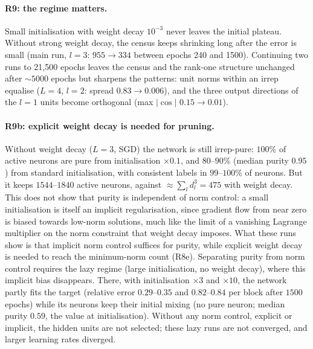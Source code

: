 \documentclass[a4paper,11pt]{article}
\theoremstyle{remark}
\theoremstyle{definition}
\begin{document}
\paragraph{R9: the regime matters.} Small initialisation with weight decay
$10^{-3}$ never leaves the initial plateau. Without strong weight decay, the census
keeps shrinking long after the error is small (main run, $l=3$: $955\to334$
between epochs 240 and 1500). Continuing two runs to 21{,}500 epochs leaves the
census and the rank-one structure unchanged after $\sim5000$ epochs but sharpens
the patterns: unit norms within an irrep equalise ($L=4$, $l=2$: spread
$0.83\to0.006$), and the three output directions of the $l=1$ units become
orthogonal (max $|\cos|$ $0.15\to0.01$).

\paragraph{R9b: explicit weight decay is needed for pruning.} Without weight decay
($L=3$, SGD) the network is still irrep-pure: $100\%$ of active neurons are pure
from initialisation $\times0.1$, and $80$--$90\%$ (median purity $0.95$) from
standard initialisation, with consistent labels in $99$--$100\%$ of neurons. But it
keeps $1544$--$1840$ active neurons, against $\approx\sum_ld_l^3=475$ with weight
decay. This does not show that purity is independent of norm control: a small
initialisation is itself an implicit regularisation, since gradient flow from near
zero is biased towards low-norm solutions, much like the limit of a vanishing
Lagrange multiplier on the norm constraint that weight decay imposes. What these runs
show is that implicit norm control suffices for purity, while explicit weight decay
is needed to reach the minimum-norm count (R8e). Separating purity from norm control
requires the lazy regime (large initialisation, no weight decay), where this
implicit bias disappears. There, with initialisation $\times3$ and $\times10$, the
network partly fits the target (relative error $0.29$--$0.35$ and $0.82$--$0.84$
per block after $1500$ epochs) while its neurons keep their initial mixing (no pure
neuron; median purity $0.59$, the value at initialisation). Without any norm
control, explicit or implicit, the hidden units are not selected; these lazy runs
are not converged, and larger learning rates diverged.
\end{document}
